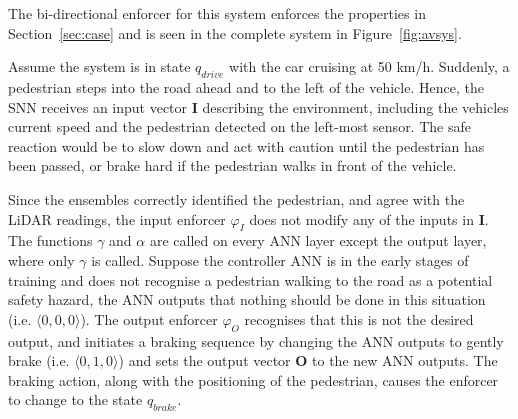 The bi-directional enforcer for this system enforces the properties in Section~\ref{sec:case} %
and is seen in the complete system in Figure~\ref{fig:avsys}.

\begin{example}
	Assume the system is in state $q_{drive}$ with the car cruising at 50 km/h.
	Suddenly, a pedestrian steps into the road ahead and to the left of the vehicle.
	Hence, the \ac{SNN} receives an input vector $\mathbf{I}$ describing the environment, including the vehicles current speed and the pedestrian detected on the left-most sensor.%
	The safe reaction would be to slow down and act with caution until the pedestrian has been passed, or brake hard if the pedestrian walks in front of the vehicle.
	
	Since the ensembles correctly identified the pedestrian, and agree with the \ac{LiDAR} readings, the input enforcer $\varphi_I$ does not modify any of the inputs in $\mathbf{I}$.
	The functions $\gamma$ and $\alpha$ are called on every \ac{ANN} layer except the output layer, where only $\gamma$ is called.
	Suppose the controller \ac{ANN} is in the early stages of training and does not recognise a pedestrian walking to the road as a potential safety hazard, the \ac{ANN} outputs that nothing should be done in this situation (i.e. $\langle 0, 0, 0 \rangle$).
	The output enforcer $\varphi_O$ recognises that this is not the desired output, and initiates a braking sequence by changing the \ac{ANN} outputs to gently brake (i.e. $\langle 0, 1, 0 \rangle$) and sets the output vector $\mathbf{O}$ to the new \ac{ANN} outputs.
	The braking action, along with the positioning of the pedestrian, causes the enforcer to change to the state $q_{brake}$.
\end{example}

